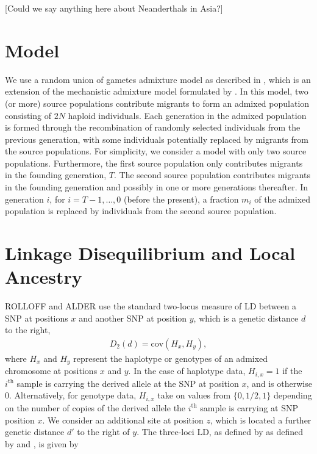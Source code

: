 [Could we say anything here about Neanderthals in Asia?]

\section{Model}
We use a random union of gametes admixture model as described in \cite{liang2014understanding}, which is an extension of the mechanistic admixture model formulated by \cite{verdu2011general}. In this model, two (or more) source populations contribute migrants to form an admixed population consisting of $2N$ haploid individuals. Each generation in the admixed population is formed through the recombination of randomly selected individuals from the previous generation, with some individuals potentially replaced by migrants from the source populations. For simplicity, we consider a model with only two source populations. Furthermore, the first source population only contributes migrants in the founding generation, $T$. The second source population contributes migrants in the founding generation and possibly in one or more generations thereafter. In generation $i$, for $i=T-1,\dots,0$ (before the present), a fraction $m_i$ of the admixed population is replaced by individuals from the second source population.

\section{Linkage Disequilibrium and Local Ancestry}
ROLLOFF and ALDER use the standard two-locus measure of LD between a SNP at positions $x$ and another SNP at position $y$, which is a genetic distance $d$ to the right,
\begin{align}
D_2(d) = \text{cov}(H_x,H_y),
\label{D2}
\end{align}
where $H_x$ and $H_y$ represent the haplotype or genotypes of an admixed chromosome at positions $x$ and $y$. In the case of haplotype data, $H_{i,x}=1$ if the $i^\text{th}$ sample is carrying the derived allele at the SNP at position $x$, and is otherwise 0. Alternatively, for genotype data, $H_{i,x}$ take on values from $\{0,1/2,1\}$ depending on the number of copies of the derived allele the $i^\text{th}$ sample is carrying at SNP position $x$.
We consider an additional site at position $z$, which is located a further genetic distance $d'$ to the right of $y$. The three-loci LD, as defined by as defined by \cite{bennett1952theory} and \cite{slatkin1972treating}, is given by

